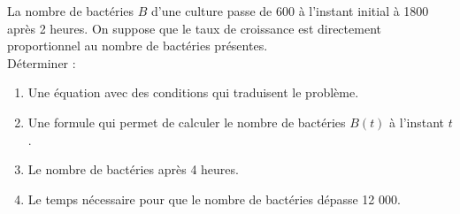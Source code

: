 \documentclass[a4paper,11pt,exos]{nsi} %
\begin{document}
{}
La nombre de bactéries $B$ d'une culture passe de 600 à l'instant initial à 1800 après 2 heures. On suppose que le taux de croissance est directement proportionnel au nombre de bactéries présentes.\\[.5em]
Déterminer :
\begin{enumerate}
        \item Une équation avec des conditions qui traduisent le problème.
        \item Une formule qui permet de calculer le nombre de bactéries $B(t)$ à l'instant $t$.
        \item Le nombre de bactéries après 4 heures.
        \item Le temps nécessaire pour que le nombre de bactéries dépasse 12 000.
\end{enumerate}
\end{document}
